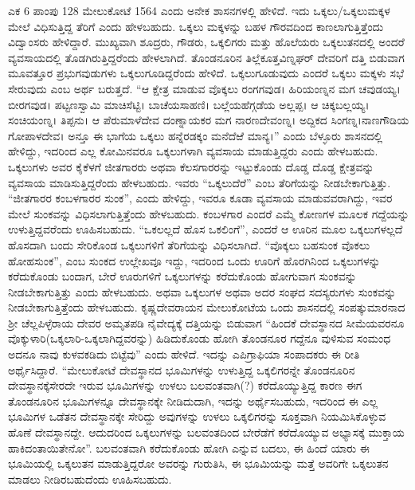 {ಎಕ 6 ಪಾಂಪು 128 ಮೇಲುಕೋಟೆ 1564} ಎಂದು ಅನೇಕ ಶಾಸನಗಳಲ್ಲಿ ಹೇಳಿದೆ. ಇದು ಒಕ್ಕಲು/ಒಕ್ಕಲುಮಕ್ಕಳ ಮೇಲೆ ವಿಧಿಸುತ್ತಿದ್ದ ತೆರಿಗೆ ಎಂದು ಹೇಳಬಹುದು. ಒಕ್ಕಲು ಮಕ್ಕಳನ್ನು ಬಹಳ ಗೌರವದಿಂದ ಕಾಣಲಾಗುತ್ತಿತ್ತೆಂದು ವಿದ್ವಾಂಸರು ಹೇಳಿದ್ದಾರೆ. ಮುಖ್ಯವಾಗಿ ಶೂದ್ರರು, ಗೌಡರು, ಒಕ್ಕಲಿಗರು ಮತ್ತು ಹೊಲೆಯರು ಒಕ್ಕಲುತನದಲ್ಲಿ ಅಂದರೆ ವ್ಯವಸಾಯದಲ್ಲಿ ತೊಡಗಿರುತ್ತಿದ್ದರೆಂದು ಹೇಳಲಾಗಿದೆ. ತೊಂಡನೂರಿನ ತಿಲ್ಲೆಕೂತ್ತವಿಣ್ನಘರ್​ ದೇವರಿಗೆ ದತ್ತಿ ಬಿಡುವಾಗ ಮೂವತ್ತೂರ ಪ್ರಭುಗವುಡುಗಳು ಒಕ್ಕಲುಗೂಡಿದ್ದರೆಂದು ಹೇಳಿದೆ. ಒಕ್ಕಲುಗೂಡುವುದು ಎಂದರೆ ಒಕ್ಕಲು ಮಕ್ಕಳು ಸಭೆ ಸೇರುವುದು ಎಂಬ ಅರ್ಥ ಬರುತ್ತದೆ. “ಆ ಕ್ಷೇತ್ರ ಮಾಡುವ ವೊಕ್ಕಲು ರಂಗಗವುಡ। ಹಿರಿಯಂಣ್ನನ ಮಗ ಚವುಡಯ್ಯ। ಬೀರಗವುಡ। ಪಟ್ಟಣಸ್ವಾಮಿ ಮಾಚಿಸೆಟ್ಟಿ। ಬಾಚೆಯಸಾಹಣಿ। ಬಲ್ಲೆಯಹೆಗ್ಗಡೆಯ ಅಲ್ಲಪ್ಪ। ಆ ಚಿಕ್ಕಬಲ್ಲಯ್ಯ।ಸಂಚಿಯಂಣ್ನ। ತಿಪ್ಪನು। ಆ ಪೆರುಮಾಳೆದೇವ ದಂಣ್ನಾಯಕರ ಮಗ ನಾರಣದೇವಂಣ್ನ। ಅದ್ದಿಕದ ಸಿಂಗಣ್ನ।ನಾಣಗೌಡಿಯ ಗೋಪಾಳದೇವ। ಅನ್ತೂ ಈ ಭಾಗೆಯ ಒಕ್ಕಲು ಹನ್ನೆರಡಕ್ಕಂ ಮನೆದೆಱೆ ಮಾನ್ಯ।” ಎಂದು ಬೆಳ್ಳೂರು ಶಾಸನದಲ್ಲಿ ಹೇಳಿದ್ದು, ಇದರಿಂದ ಎಲ್ಲ ಕೋಮಿನವರೂ ಒಕ್ಕಲುಗಳಾಗಿ ವ್ಯವಸಾಯ ಮಾಡುತ್ತಿದ್ದರು ಎಂದು ಹೇಳಬಹುದು. ಒಕ್ಕಲುಗಳು ಅವರ ಕೈಕೆಳಗೆ ಜೀತಗಾರರು ಅಥವಾ ಕೆಲಸಗಾರರನ್ನು ಇಟ್ಟುಕೊಂಡು ದೊಡ್ಡ ದೊಡ್ಡ ಕ್ಷೇತ್ರವನ್ನು ವ್ಯವಸಾಯ ಮಾಡಿಸುತ್ತಿದ್ದರೆಂದು ಹೇಳಬಹುದು. ಇವರು “ಒಕ್ಕಲುದೆರೆ” ಎಂಬ ತೆರಿಗೆಯನ್ನು ನೀಡಬೇಕಾಗುತ್ತಿತ್ತು. “ಜೀತಗಾರರ ಕಂಬಳಗಾರರ ಸುಂಕ”, ಎಂದು ಹೇಳಿದ್ದು, ಇವರೂ ಕೂಡಾ ವ್ಯವಸಾಯ ಮಾಡುವವರಾಗಿದ್ದು, ಇವರ ಮೇಲೆ ಸುಂಕವನ್ನು ವಿಧಿಸಲಾಗುತ್ತಿತ್ತೆಂದು ಹೇಳಬಹುದು. ಕಂಬಳಗಾರ ಎಂದರೆ ಎಮ್ಮೆ ಕೋಣಗಳ ಮೂಲಕ ಗದ್ದೆಯನ್ನು ಉಳುತ್ತಿದ್ದವರೆಂದು ಊಹಿಸಬಹುದು. “ಒಕಲಲ್ಲದೆ ಹೊಸ ಒಕಲಿಂಗೆ”, ಎಂದರೆ ಆ ಊರಿನ ಮೂಲ ಒಕ್ಕಲುಗಳಲ್ಲದೆ ಹೊಸದಾಗಿ ಬಂದು ಸೇರಿಕೊಂಡ ಒಕ್ಕಲುಗಳಿಗೆ ತೆರಿಗೆಯನ್ನು ವಿಧಿಸಲಾಗಿದೆ. “ವೊಕ್ಕಲು ಬಹಸುಂಕ ವೊಕಲು ಹೋಹಸುಂಕ”, ಎಂಬ ಸುಂಕದ ಉಲ್ಲೇಖವೂ ಇದ್ದು, ಇದರಿಂದ ಒಂದು ಊರಿಗೆ ಹೊರಗಿನಿಂದ ಒಕ್ಕಲುಗಳನ್ನು ಕರೆದುಕೊಂಡು ಬಂದಾಗ, ಬೇರೆ ಊರುಗಳಿಗೆ ಒಕ್ಕಲುಗಳನ್ನು ಕರೆದುಕೊಂಡು ಹೋಗುವಾಗ ಸುಂಕವನ್ನು ನೀಡಬೇಕಾಗುತ್ತಿತ್ತು ಎಂದು ಹೇಳಬಹುದು. ಅಥವಾ ಒಕ್ಕಲುಗಳ ಅಥವಾ ಅದರ ಸಂಘದ ಸದಸ್ಯರುಗಳು ಸುಂಕವನ್ನು ನೀಡಬೇಕಾಗುತ್ತಿತ್ತೆಂದು ಹೇಳಬಹುದು. ಕೃಷ್ಣದೇವರಾಯನ ಮೇಲುಕೋಟೆಯ ಒಂದು ಶಾಸನದಲ್ಲಿ ಸಂಪತ್ಕುಮಾರನಾದ ಶ‍್ರೀ ಚೆಲ್ಲಪಿಳ್ಳೆರಾಯ ದೇವರ ಅಮೃತಪಡಿ ನೈವೇದ್ಯಕ್ಕೆ ದತ್ತಿಯನ್ನು ಬಿಡುವಾಗ “ಹಿಂದಕೆ ದೇವಸ್ಥಾನದ ಸೀಮೆಯವರನೂ ವೊಕ್ಕುಳಾರಿ(ಒಕ್ಕಲಾರಿ-ಒಕ್ಕಲಾಗಿದ್ದವರನ್ನು) ಹಿಡಿದುಕೊಂಡು ಹೋಗಿ ತೊಂಡನೂರ ಗದ್ದೆನೂ ವುಳಿಸುವ ಸಂಮಂಧ ಅದನೂ ನಾವು ಕುಳವಕಡಿದು ಬಿಟ್ಟೆವು” ಎಂದು ಹೇಳಿದೆ. ಇದನ್ನು ಎಪಿಗ್ರಾಫಿಯಾ ಸಂಪಾದಕರು ಈ ರೀತಿ ಅರ್ಥೈಸಿದ್ದಾರೆ. “ಮೇಲುಕೋಟೆ ದೇವಸ್ಥಾನದ ಭೂಮಿಗಳನ್ನು ಉಳುತ್ತಿದ್ದ ಒಕ್ಕಲಿಗರನ್ನೇ ತೊಂಡನೂರಿನ ದೇವಸ್ಥಾನಕ್ಕೆ\break ಸೇರದೇ ಇರುವ ಭೂಮಿಗಳನ್ನು ಉಳಲು ಬಲವಂತವಾಗಿ(?) ಕರೆದೊಯ್ಯುತ್ತಿದ್ದ ಕಾರಣ ಈಗ ತೊಂಡನೂರಿನ ಭೂಮಿಗಳನ್ನೂ ದೇವಸ್ಥಾನಕ್ಕೇ ನೀಡಿದುದಾಗಿ, ಇದನ್ನು ಅರ್ಥೈಸಬಹುದು, ಇದರಿಂದ ಈ ಎಲ್ಲ ಭೂಮಿಗಳ ಒಡೆತನ ದೇವಸ್ಥಾನಕ್ಕೇ ಸೇರಿದ್ದು ಅವುಗಳನ್ನು ಉಳಲು ಒಕ್ಕಲಿಗರನ್ನು ಸೂಕ್ತವಾಗಿ ನಿಯಮಿಸಿಕೊಳ್ಳುವ ಹೊಣೆ ದೇವಸ್ಥಾನದ್ದೇ. ಆದುದರಿಂದ ಒಕ್ಕಲುಗಳನ್ನು ಬಲವಂತದಿಂದ ಬೇರೆಡೆಗೆ ಕರೆದೊಯ್ಯುವ ಅಭ್ಯಾಸಕ್ಕೆ ಮುಕ್ತಾಯ ಹಾಕಿದಂತಾಯಿತೇನೋ”. ಬಲವಂತವಾಗಿ ಕರೆದುಕೊಂಡು ಹೋಗಿ ಎನ್ನುವ ಬದಲು, ಈ ಹಿಂದೆ ಯಾರು ಈ ಭೂಮಿಯಲ್ಲಿ ಒಕ್ಕಲುತನ ಮಾಡುತ್ತಿದ್ದರೋ ಅವರನ್ನು ಗುರುತಿಸಿ, ಈ ಭೂಮಿಯನ್ನು ಮತ್ತೆ ಅವರಿಗೇ ಒಕ್ಕಲುತನ ಮಾಡಲು ನೀಡಿರಬಹುದೆಂದು ಊಹಿಸಬಹುದು.

